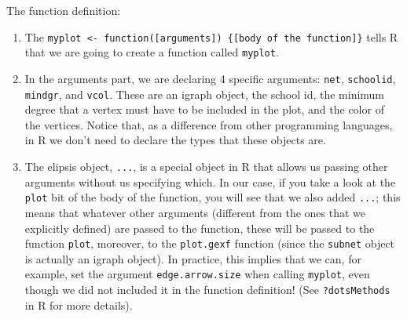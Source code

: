 \documentclass[
]{book}
\newenvironment{Shaded}{\begin{snugshade}}{\end{snugshade}}
\newcommand{\AttributeTok}[1]{\textcolor[rgb]{0.77,0.63,0.00}{#1}}
\newcommand{\CommentTok}[1]{\textcolor[rgb]{0.56,0.35,0.01}{\textit{#1}}}
\newcommand{\ConstantTok}[1]{\textcolor[rgb]{0.00,0.00,0.00}{#1}}
\newcommand{\ControlFlowTok}[1]{\textcolor[rgb]{0.13,0.29,0.53}{\textbf{#1}}}
\newcommand{\DecValTok}[1]{\textcolor[rgb]{0.00,0.00,0.81}{#1}}
\newcommand{\FunctionTok}[1]{\textcolor[rgb]{0.00,0.00,0.00}{#1}}
\newcommand{\NormalTok}[1]{#1}
\newcommand{\OtherTok}[1]{\textcolor[rgb]{0.56,0.35,0.01}{#1}}
\newcommand{\SpecialCharTok}[1]{\textcolor[rgb]{0.00,0.00,0.00}{#1}}
\newcommand{\StringTok}[1]{\textcolor[rgb]{0.31,0.60,0.02}{#1}}
\begin{document}
\begin{Shaded}
\end{Shaded}

The function definition:

\begin{enumerate}
\def\labelenumi{\arabic{enumi}.}
\item
  The \texttt{myplot\ \textless{}-\ function({[}arguments{]})\ \{{[}body\ of\ the\ function{]}\}} tells R that we are going to create a function called \texttt{myplot}.
\item
  In the arguments part, we are declaring 4 specific arguments: \texttt{net}, \texttt{schoolid}, \texttt{mindgr}, and \texttt{vcol}. These are an igraph object, the school id, the minimum degree that a vertex must have to be included in the plot, and the color of the vertices. Notice that, as a difference from other programming languages, in R we don't need to declare the types that these objects are.
\item
  The elipsis object, \texttt{...}, is a special object in R that allows us passing other arguments without us specifying which. In our case, if you take a look at the \texttt{plot} bit of the body of the function, you will see that we also added \texttt{...}; this means that whatever other arguments (different from the ones that we explicitly defined) are passed to the function, these will be passed to the function \texttt{plot}, moreover, to the \texttt{plot.gexf} function (since the \texttt{subnet} object is actually an igraph object). In practice, this implies that we can, for example, set the argument \texttt{edge.arrow.size} when calling \texttt{myplot}, even though we did not included it in the function definition! (See \texttt{?dotsMethods} in R for more details).
\end{enumerate}
\end{document}
